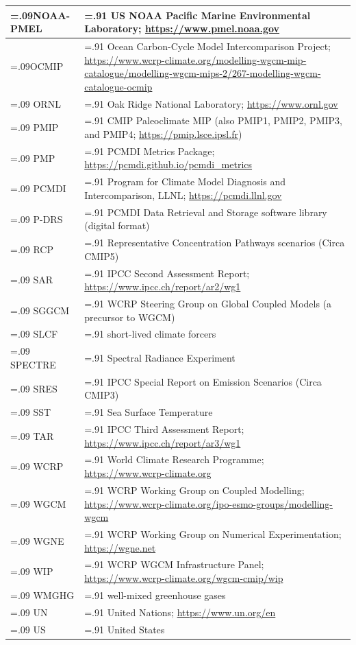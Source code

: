 \documentclass[gmd, preprint]{copernicus}
\begin{document}
\begin{table}[htp]
{\begin{tabularx}{1\textwidth} { 
	  | >{\raggedright\arraybackslash\hsize=.09\hsize}X
	  | >{\centering\arraybackslash\hsize=.91\hsize}X | }
NOAA-PMEL & US NOAA Pacific Marine Environmental Laboratory; \url{https://www.pmel.noaa.gov}\\ \hline
OCMIP & Ocean Carbon-Cycle Model Intercomparison Project; \url{https://www.wcrp-climate.org/modelling-wgcm-mip-catalogue/modelling-wgcm-mips-2/267-modelling-wgcm-catalogue-ocmip}\\ \hline
ORNL & Oak Ridge National Laboratory; \url{https://www.ornl.gov}\\ \hline
PMIP & CMIP Paleoclimate MIP (also PMIP1, PMIP2, PMIP3, and PMIP4; \url{https://pmip.lsce.ipsl.fr})\\ \hline
PMP & PCMDI Metrics Package; \url{https://pcmdi.github.io/pcmdi_metrics}\\ \hline
PCMDI & Program for Climate Model Diagnosis and Intercomparison, LLNL; \url{https://pcmdi.llnl.gov}\\ \hline
P-DRS & PCMDI Data Retrieval and Storage software library (digital format)\\ \hline
RCP & Representative Concentration Pathways scenarios (Circa CMIP5)\\ \hline
SAR & IPCC Second Assessment Report; \url{https://www.ipcc.ch/report/ar2/wg1}\\ \hline
SGGCM & WCRP Steering Group on Global Coupled Models (a precursor to WGCM)\\ \hline
SLCF & short-lived climate forcers\\ \hline
SPECTRE & Spectral Radiance Experiment\\ \hline
SRES & IPCC Special Report on Emission Scenarios (Circa CMIP3)\\ \hline
SST & Sea Surface Temperature\\ \hline
TAR & IPCC Third Assessment Report; \url{https://www.ipcc.ch/report/ar3/wg1}\\ \hline
WCRP & World Climate Research Programme; \url{https://www.wcrp-climate.org}\\ \hline
WGCM & WCRP Working Group on Coupled Modelling; \url{https://www.wcrp-climate.org/ipo-esmo-groups/modelling-wgcm}\\ \hline
WGNE & WCRP Working Group on Numerical Experimentation; \url{https://wgne.net}\\ \hline
WIP & WCRP WGCM Infrastructure Panel; \url{https://www.wcrp-climate.org/wgcm-cmip/wip}\\ \hline
WMGHG & well-mixed greenhouse gases\\ \hline
UN & United Nations; \url{https://www.un.org/en}\\ \hline
US & United States\\
\hline
\end{tabularx}
} %
\label{tab:tabAppE1-Acronyms}
\footnotesize{}
\end{table}
\end{document}
